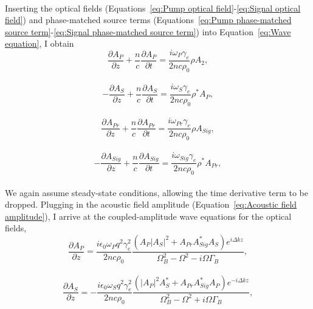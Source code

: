 \\
Inserting the optical fields (Equations~\ref{eq:Pump optical field}-\ref{eq:Signal optical field}) and phase-matched source terms (Equations~\ref{eq:Pump phase-matched source term}-\ref{eq:Signal phase-matched source term}) into Equation~\ref{eq:Wave equation}, I obtain
\\
\begin{equation}
    \frac{\partial A_{P}}{\partial z} + \frac{n}{c}\frac{\partial A_{P}}{\partial t} = \frac{i\omega_{P}\gamma_{e}}{2nc\rho_{0}}\rho A_{2},
\end{equation}
\\
\begin{equation}
    -\frac{\partial A_{S}}{\partial z} + \frac{n}{c}\frac{\partial A_{S}}{\partial t} = \frac{i\omega_{S}\gamma_{e}}{2nc\rho_{0}}\rho^{*}A_{P},
\end{equation}
\\
\begin{equation}
    \frac{\partial A_{Pr}}{\partial z} + \frac{n}{c}\frac{\partial A_{Pr}}{\partial t} = \frac{i\omega_{Pr}\gamma_{e}}{2nc\rho_{0}}\rho A_{Sig},
\end{equation}
\\
\begin{equation}
    -\frac{\partial A_{Sig}}{\partial z} + \frac{n}{c}\frac{\partial A_{Sig}}{\partial t} = \frac{i\omega_{Sig}\gamma_{e}}{2nc\rho_{0}}\rho^{*}A_{Pr},
\end{equation}
\\
We again assume steady-state conditions, allowing the time derivative term to be dropped. Plugging in the acoustic field amplitude (Equation~\ref{eq:Acoustic field amplitude}), I arrive at the coupled-amplitude wave equations for the optical fields,
\\
\begin{equation}
    \frac{\partial A_{P}}{\partial z} = \frac{i\epsilon_{0}\omega_{P} q^{2}\gamma_{e}^{2}}{2nc\rho_{0}}\frac{(A_{P}|A_{S}|^{2} + A_{Pr}A_{Sig}^{*}A_{S})e^{i\Delta kz}}{\Omega_{B}^{2} - \Omega^{2} - i\Omega\Gamma_{B}},
    \label{eq:Pump coupled-amplitude wave equation}
\end{equation}
\\
\begin{equation}
    \frac{\partial A_{S}}{\partial z} = -\frac{i\epsilon_{0}\omega_{S} q^{2}\gamma_{e}^{2}}{2nc\rho_{0}}\frac{(|A_{P}|^{2}A_{S}^{*} + A_{Pr}A_{Sig}^{*}A_{P})e^{-i\Delta kz}}{\Omega_{B}^{2} - \Omega^{2} + i\Omega\Gamma_{B}},
\end{equation}
